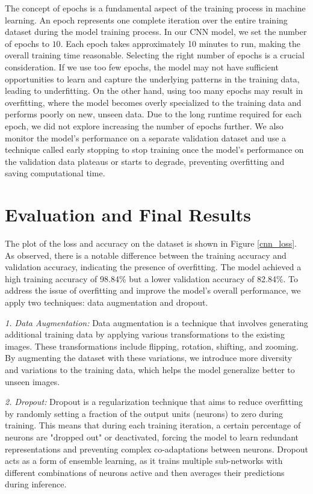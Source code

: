 \documentclass[11pt,a4paper]{article}
\begin{document}
The concept of epochs is a fundamental aspect of the training process in machine learning. An epoch represents one complete iteration over the entire training dataset during the model training process. In our CNN model, we set the number of epochs to $10$. Each epoch takes approximately 10 minutes to run, making the overall training time reasonable. Selecting the right number of epochs is a crucial consideration. If we use too few epochs, the model may not have sufficient opportunities to learn and capture the underlying patterns in the training data, leading to underfitting. On the other hand, using too many epochs may result in overfitting, where the model becomes overly specialized to the training data and performs poorly on new, unseen data. Due to the long runtime required for each epoch, we did not explore increasing the number of epochs further. We also monitor the model's performance on a separate validation dataset and use a technique called early stopping to stop training once the model's performance on the validation data plateaus or starts to degrade, preventing overfitting and saving computational time. 

\section{Evaluation and Final Results} 
The plot of the loss and accuracy on the dataset is shown in Figure \ref{cnn_loss}. As observed, there is a notable difference between the training accuracy and validation accuracy, indicating the presence of overfitting. The model achieved a high training accuracy of 98.84\% but a lower validation accuracy of 82.84\%. To address the issue of overfitting and improve the model's overall performance, we apply two techniques: data augmentation and dropout.

\emph{1. Data Augmentation:}
   Data augmentation is a technique that involves generating additional training data by applying various transformations to the existing images. These transformations include flipping, rotation, shifting, and zooming. By augmenting the dataset with these variations, we introduce more diversity and variations to the training data, which helps the model generalize better to unseen images.

\emph{2. Dropout:}
   Dropout is a regularization technique that aims to reduce overfitting by randomly setting a fraction of the output units (neurons) to zero during training. This means that during each training iteration, a certain percentage of neurons are "dropped out" or deactivated, forcing the model to learn redundant representations and preventing complex co-adaptations between neurons. Dropout acts as a form of ensemble learning, as it trains multiple sub-networks with different combinations of neurons active and then averages their predictions during inference.
\end{document}
